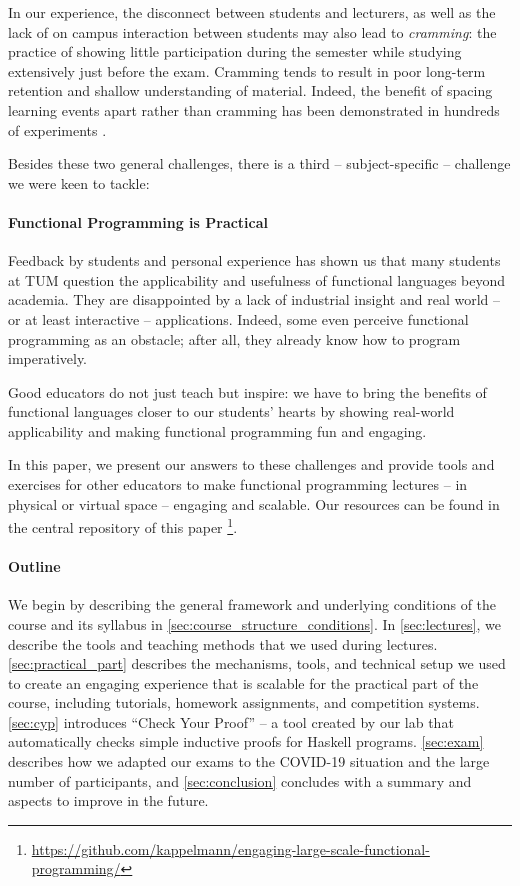 In our experience, the disconnect between students and lecturers, as well as the lack of on campus interaction between students may also lead to \emph{cramming}:
the practice of showing little participation during the semester
while studying extensively just before the exam.
Cramming tends to result in poor long-term retention and shallow understanding of material.
Indeed, the benefit of spacing learning events apart rather than cramming has been demonstrated in hundreds of experiments \cite{cramming1,cramming2}.

\vspace{\baselineskip}\noindent
Besides these two general challenges,
there is a third -- subject-specific --
challenge we were keen to tackle:

\paragraph{Functional Programming is Practical}
Feedback by students and personal experience has shown us that many students
at TUM question the applicability and usefulness
of functional languages beyond academia.
They are disappointed by a lack of industrial insight
and real world -- or at least interactive -- applications.
Indeed, some even perceive functional programming as an obstacle;
after all, they already know how to program imperatively.

Good educators do not just teach but inspire:
we have to bring the benefits of functional languages
closer to our students' hearts
by showing real-world applicability and making functional programming fun and engaging.


\vspace{\baselineskip}\noindent
In this paper,
we present our answers to these challenges
and provide tools and exercises for other educators
to make functional programming lectures -- in physical or virtual space -- engaging and scalable.
Our resources can be found in the central repository of this paper \footnote{\url{https://github.com/kappelmann/engaging-large-scale-functional-programming/}}.

\paragraph{Outline}

We begin by describing the general framework and underlying conditions of the course and its syllabus in \cref{sec:course_structure_conditions}.
In \cref{sec:lectures},
we describe the tools and teaching methods that we used during lectures.
\cref{sec:practical_part} describes the
mechanisms, tools, and technical setup
we used to create an engaging experience
that is scalable
for the practical part of the course,
including tutorials, homework assignments, and
competition systems.
\cref{sec:cyp} introduces
``Check Your Proof'' -- a tool created
by our lab that automatically checks simple inductive proofs for Haskell programs.
\cref{sec:exam} describes how we adapted our exams to the COVID-19 situation and the large number of participants,
and \cref{sec:conclusion} concludes with a summary and aspects to improve in the future.

